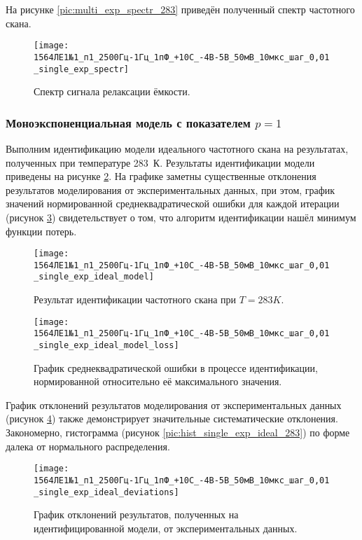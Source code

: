 	На рисунке \ref{pic:multi_exp_spectr_283} приведён полученный спектр 
	частотного скана.

	\begin{figure}[!htp]
		\centering
		\texttt{[image: 1564ЛЕ1№1\_п1\_2500Гц-1Гц\_1пФ\_+10С\_-4В-5В\_50мВ\_10мкс\_шаг\_0,01\_single\_exp\_spectr]}
		\caption{Спектр сигнала релаксации ёмкости.}
		\label{pic:spectr_single_exp_283}
	\end{figure}


	\newpage
	\subsubsection{Моноэкспоненциальная модель с показателем $p = 1$}

	Выполним идентификацию модели идеального частотного скана на результатах,
	полученных при температуре 283~К. Результаты идентификации модели приведены 
	на рисунке \ref{pic:model_single_exp_ideal_283}. На графике заметны
	существенные отклонения результатов моделирования от экспериментальных 
	данных, при этом, график значений нормированной среднеквадратической ошибки
	для каждой итерации (рисунок \ref{pic:loss_single_exp_ideal_283}) 
	свидетельствует о том, что алгоритм идентификации нашёл минимум функции 
	потерь.

	\begin{figure}[!htp]
		\centering
		\texttt{[image: 1564ЛЕ1№1\_п1\_2500Гц-1Гц\_1пФ\_+10С\_-4В-5В\_50мВ\_10мкс\_шаг\_0,01\_single\_exp\_ideal\_model]}
		\caption{Результат идентификации частотного скана при $T=283K$.}
		\label{pic:model_single_exp_ideal_283}
	\end{figure}

	\begin{figure}[!htp]
		\centering
		\texttt{[image: 1564ЛЕ1№1\_п1\_2500Гц-1Гц\_1пФ\_+10С\_-4В-5В\_50мВ\_10мкс\_шаг\_0,01\_single\_exp\_ideal\_model\_loss]}
		\caption{График среднеквадратической ошибки в процессе идентификации,
		         нормированной относительно её максимального значения.}
		\label{pic:loss_single_exp_ideal_283}
	\end{figure}

	График отклонений результатов моделирования от экспериментальных данных 
	(рисунок \ref{pic:deviations_single_exp_ideal_283}) также демонстрирует
	значительные систематические отклонения. Закономерно, гистограмма (рисунок
	\ref{pic:hist_single_exp_ideal_283}) по форме далека от нормального
	распределения.

	\begin{figure}[!htp]
		\centering
		\texttt{[image: 1564ЛЕ1№1\_п1\_2500Гц-1Гц\_1пФ\_+10С\_-4В-5В\_50мВ\_10мкс\_шаг\_0,01\_single\_exp\_ideal\_deviations]}
		\caption{График отклонений результатов, полученных на идентифицированной
		модели, от экспериментальных данных.}
		\label{pic:deviations_single_exp_ideal_283}
	\end{figure}

